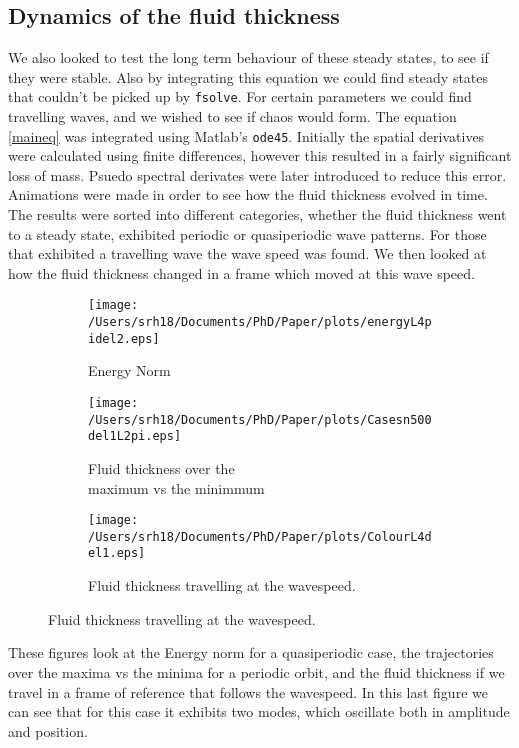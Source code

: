 \documentclass[12pt]{article}
\begin{document}
\subsection{Dynamics of the fluid thickness}
We also looked to test the long term behaviour of these steady states, to see if they were stable. Also by integrating this equation we could find steady states that couldn't be picked up by \texttt{fsolve}.
For certain parameters we could find travelling waves, and we wished to see if chaos would form. The equation 
\eqref{maineq} was integrated using Matlab's \texttt{ode45}. Initially the spatial derivatives were calculated using finite differences, however this resulted in a fairly significant loss of mass. Psuedo spectral derivates were later introduced to reduce this error. Animations were made in order to see how the fluid thickness evolved in time. The results were sorted into different categories, whether the fluid thickness went to a steady state, exhibited periodic or quasiperiodic wave patterns. For those that exhibited a travelling wave the wave speed was found. We then looked at how the fluid thickness changed in a frame which moved at this wave speed.
\begin{figure}[H]
	\caption{Example fluid thicknesses with a sinusoidal wall}	\begin{subfigure}{.33\linewidth}
		\centering
		\caption{Energy Norm\newline}
		\texttt{[image: /Users/srh18/Documents/PhD/Paper/plots/energyL4pidel2.eps]}
	\end{subfigure}	\begin{subfigure}{.33\linewidth}
		\centering
		\caption{Fluid thickness over the \\maximum vs the minimmum}
		\texttt{[image: /Users/srh18/Documents/PhD/Paper/plots/Casesn500del1L2pi.eps]}
	\end{subfigure}\begin{subfigure}{.33\linewidth}
		\centering
		\caption{Fluid thickness travelling at the wavespeed.}
		\texttt{[image: /Users/srh18/Documents/PhD/Paper/plots/ColourL4del1.eps]}
\end{subfigure}\end{figure}
These figures look at the Energy norm for a quasiperiodic case, the trajectories over the maxima vs the minima for a periodic orbit, and the fluid thickness if we travel in a frame of reference that follows the wavespeed. In this last figure we can see that for this case it exhibits two modes, which oscillate both in amplitude and position.
\end{document}

